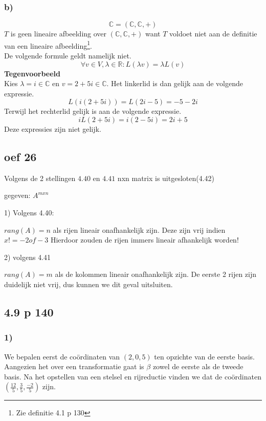 \documentclass[lineaire_algebra_oplossingen.tex]{subfiles}
\begin{document}
\subsubsection*{b)}
\[
\mathbb{C} = (\mathbb{C},\mathbb{C},+)
\]
$T$ is geen lineaire afbeelding over $(\mathbb{C},\mathbb{C},+)$ want $T$ voldoet niet aan de definitie van een lineaire afbeelding\footnote{Zie definitie 4.1 p 130}. \\
De volgende formule geldt namelijk niet.
\[\forall v\in V, \lambda \in \mathbb{R}: L(\lambda v) = \lambda L(v)\]
\textbf{Tegenvoorbeeld}\\
Kies $\lambda = i \in \mathbb{C}$ en $v = 2+5i\in \mathbb{C}$.
Het linkerlid is dan gelijk aan de volgende expressie.
\[
L(i(2+5i)) = L(2i-5) = -5 -2i
\]
Terwijl het rechterlid gelijk is aan de volgende expressie.
\[
iL(2+5i) = i(2-5i) = 2i+5
\]
Deze expressies zijn niet gelijk.

\subsection*{oef 26}

Volgens de 2 stellingen $4.40$ en $4.41$ nxn matrix is uitgesloten(4.42)

gegeven: $ A ^ {m x n} $

1) Volgens 4.40: 

$rang(A) = n $ als rijen lineair onafhankelijk zijn.
Deze zijn vrij indien $x != -2 of -3$ Hierdoor zouden de rijen immers lineair afhankelijk worden! 

2) volgens 4.41

$rang(A) = m $ als de kolommen lineair onafhankelijk zijn. De eerste 2 rijen zijn duidelijk niet vrij, dus kunnen we dit geval uitsluiten.


\subsection{4.9 p 140}
\subsubsection*{1)}
We bepalen eerst de co\"ordinaten van $(2,0,5)$ ten opzichte van de eerste basis. Aangezien het over een transformatie gaat is $\beta$ zowel de eerste als de tweede basis. 
Na het opstellen van een stelsel en rijreductie vinden we dat de co\"ordinaten $\left(\frac{12}{5},\frac{3}{5},\frac{-2}{5}\right)$ zijn.
\end{document}
